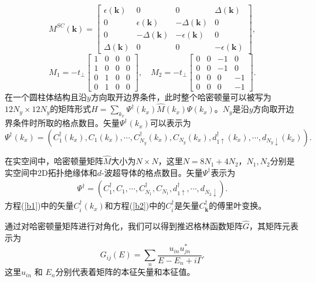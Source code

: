 \begin{equation}
M^{SC}(\mathbf{k})=
\left[
\begin{array}{cccc}
\epsilon({\mathbf{k}}) & 0 & 0 & \Delta(\mathbf{k}) \\
0 & \epsilon({\mathbf{k}}) & -\Delta(\mathbf{k}) & 0 \\
0 & -\Delta(\mathbf{k}) & -\epsilon({\mathbf{k}}) & 0 \\
\Delta(\mathbf{k}) & 0 & 0 & -\epsilon({\mathbf{k}})
\end{array}
\right],
\end{equation}
\begin{equation}
M_1=-t_{\perp}\left[
\begin{array}{cccc}
1 & 0 & 0 & 0 \\
1 & 0 & 0 & 0 \\
0 & 1 & 0 & 0 \\
0 & 1 & 0 & 0
\end{array}
\right],\quad
M_2=-t_{\perp}\left[
\begin{array}{cccc}
0 & 0 & -1 & 0 \\
0 & 0 & -1 & 0 \\
0 & 0 & 0 & -1 \\
0 & 0 & 0 & -1
\end{array}
\right].
\end{equation}
在一个圆柱体结构且沿$y$方向取开边界条件，此时整个哈密顿量可以被写为$12N_y\times 12N_y$的矩阵形式$H=\sum_{k_x}\Psi^\dagger(k_x)\hat{M}(k_x)\Psi(k_x)$。$N_y$是沿$y$方向取开边界条件时所取的格点数目。矢量$\Psi^\dagger(k_x)$可以表示为
\begin{equation}
\Psi^\dagger(k_{x}) =(C^\dagger_1(k_x),C_{1}(k_x),\cdots,C^\dagger_{N_y}(k_x),C_{N_y}(k_x),d^\dagger_{1\uparrow}(k_x),\cdots,d_{N_y\downarrow}(k_x)).\label{b1}
\end{equation}

\qquad 在实空间中，哈密顿量矩阵$\hat{M}$大小为$N\times N$，这里$N=8N_1+4N_2$，$N_1,N_2$分别是实空间中2D拓扑绝缘体和$d$-波超导体的格点数目。矢量$\Psi^\dagger$表示为
\begin{eqnarray}
\Psi^\dagger =(C^\dagger_1,C_{1},\cdots,C^\dagger_{N_1},C_{N_1},d^\dagger_{1\uparrow},\cdots,d_{N_2\downarrow}).\label{b2}
\end{eqnarray}
方程(\ref{b1})中的矢量$C^\dagger_i(k_x)$和方程(\ref{b2})中的$C^\dagger_i$是矢量$C^\dagger_\mathbf{k}$的傅里叶变换。

\qquad 通过对哈密顿量矩阵进行对角化，我们可以得到推迟格林函数矩阵$\hat{G}$，其矩阵元表示为
\begin{equation}
G_{ij}(E)=\sum_n\frac{u_{in}u^{*}_{jn}}{E-E_n+i\Gamma}.
\end{equation}
这里$u_{in}$ 和 $E_n$分别代表着矩阵的本征矢量和本征值。

